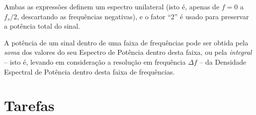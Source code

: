\documentclass[a4paper,twoside,12pt]{article}
\begin{document}
	Ambas as expressões definem um espectro unilateral (isto é, apenas de $f=0$ a $f_s/2$, descartando as frequências negativas), e o fator ``2'' é usado para preservar a potência total do sinal.
	
	A potência de um sinal dentro de uma faixa de frequências pode ser obtida pela \emph{soma} dos valores do seu Espectro de Potência dentro desta faixa, ou pela \emph{integral} -- isto é, levando em consideração a resolução em frequência $\Delta f$ -- da Densidade Espectral de Potência dentro desta faixa de frequências.
	
	\section{Tarefas}
	
\end{document}
